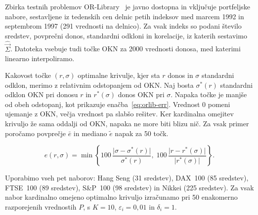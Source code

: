 \documentclass[9pt]{style/friteza}
\begin{document}
Zbirka testnih problemov OR-Library~\cite{beasley1990} je javno dostopna in vključuje portfeljske nabore, sestavljene iz tedenskih cen delnic petih indeksov med marcem 1992 in septembrom 1997 (291 vrednosti na delnico). Za vsak indeks so podani število sredstev, povprečni donos, standardni odkloni in korelacije, iz katerih sestavimo $\hat{\vec{\Sigma}}$. Datoteka vsebuje tudi točke OKN za 2000 vrednosti donosa, med katerimi linearno interpoliramo. 

Kakovost točke $(r,\sigma)$ optimalne krivulje, kjer sta $r$ donos in $\sigma$ standardni odklon, merimo z relativnim odstopanjem od OKN. Naj bosta $\sigma^{*}(r)$ standardni odklon OKN pri donosu $r$ in $r^{*}(\sigma)$ donos OKN pri $\sigma$. Napaka točke je manjše od obeh odstopanj, kot prikazuje enačba~\eqref{eq:orlib-err}. Vrednost 0 pomeni ujemanje z OKN, večja vrednost pa slabšo rešitev. Ker kardinalna omejitev krivuljo že sama oddalji od OKN, napaka ne more biti blizu nič. Za vsak primer poročamo povprečje $\bar{e}$ in mediano $\tilde{e}$ napak za 50 točk.

\begin{equation}
\label{eq:orlib-err}
e(r,\sigma)=\min\!\left\{100\,\frac{\lvert\sigma-\sigma^{*}(r)\rvert}{\sigma^{*}(r)},\;100\,\frac{\lvert r-r^{*}(\sigma)\rvert}{\lvert r^{*}(\sigma)\rvert}\right\}.
\end{equation}

Uporabimo vseh pet naborov: Hang Seng (31 sredstev), DAX~100 (85 sredstev), FTSE~100 (89 sredstev), S\&P~100 (98 sredstev) in Nikkei (225 sredstev). Za vsak nabor kardinalno omejeno optimalno krivuljo izračunamo pri 50 enakomerno razporejenih vrednostih $P$, s $K=10$, $\varepsilon_i=0{,}01$ in $\delta_i=1$. 
\end{document}
